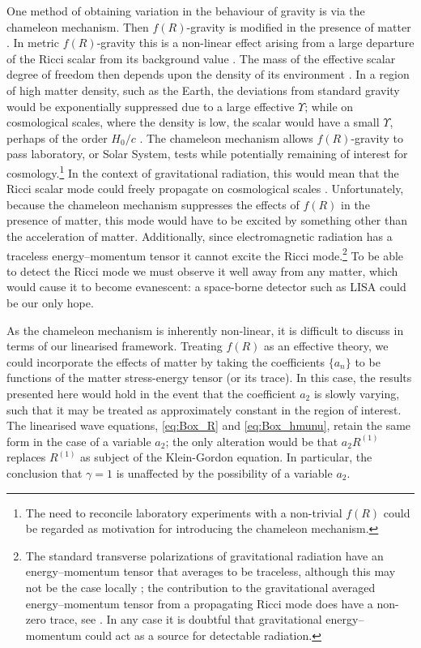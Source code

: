 One method of obtaining variation in the behaviour of gravity is via the chameleon mechanism. Then $f(R)$-gravity is modified in the presence of matter \citep{Khoury2004, Khoury2004a, Brax2004, Khoury2013}. In metric $f(R)$-gravity this is a non-linear effect arising from a large departure of the Ricci scalar from its background value \citep{DeFelice2010}. The mass of the effective scalar degree of freedom then depends upon the density of its environment \citep{Faulkner2007, Li2007}. In a region of high matter density, such as the Earth, the deviations from standard gravity would be exponentially suppressed due to a large effective $\Upsilon$; while on cosmological scales, where the density is low, the scalar would have a small $\Upsilon$, perhaps of the order $H_0/c$ \citep{Khoury2004, Khoury2004a}. The chameleon mechanism allows $f(R)$-gravity to pass laboratory, or Solar System, tests while potentially remaining of interest for cosmology.\footnote{The need to reconcile laboratory experiments with a non-trivial $f(R)$ could be regarded as motivation for introducing the chameleon mechanism.} In the context of gravitational radiation, this would mean that the Ricci scalar mode could freely propagate on cosmological scales \citep{Corda2009}. Unfortunately, because the chameleon mechanism suppresses the effects of $f(R)$ in the presence of matter, this mode would have to be excited by something other than the acceleration of matter. Additionally, since electromagnetic radiation has a traceless energy--momentum tensor it cannot excite the Ricci mode.\footnote{The standard transverse polarizations of gravitational radiation have an energy--momentum tensor that averages to be traceless, although this may not be the case locally \citep{Butcher2010}; the contribution to the gravitational averaged energy--momentum tensor from a propagating Ricci mode does have a non-zero trace, see . In any case it is doubtful that gravitational energy--momentum could act as a source for detectable radiation.} To be able to detect the Ricci mode we must observe it well away from any matter, which would cause it to become evanescent: a space-borne detector such as LISA could be our only hope.

As the chameleon mechanism is inherently non-linear, it is difficult to discuss in terms of our linearised framework. Treating $f(R)$ as an effective theory, we could incorporate the effects of matter by taking the coefficients $\{a_n\}$ to be functions of the matter stress-energy tensor (or its trace). In this case, the results presented here would hold in the event that the coefficient $a_2$ is slowly varying, such that it may be treated as approximately constant in the region of interest. The linearised wave equations, \eqref{eq:Box_R} and \eqref{eq:Box_hmunu}, retain the same form in the case of a variable $a_2$; the only alteration would be that $a_2 R^{(1)}$ replaces $R^{(1)}$ as subject of the Klein-Gordon equation. In particular, the conclusion that $\gamma = 1$ is unaffected by the possibility of a variable $a_2$.